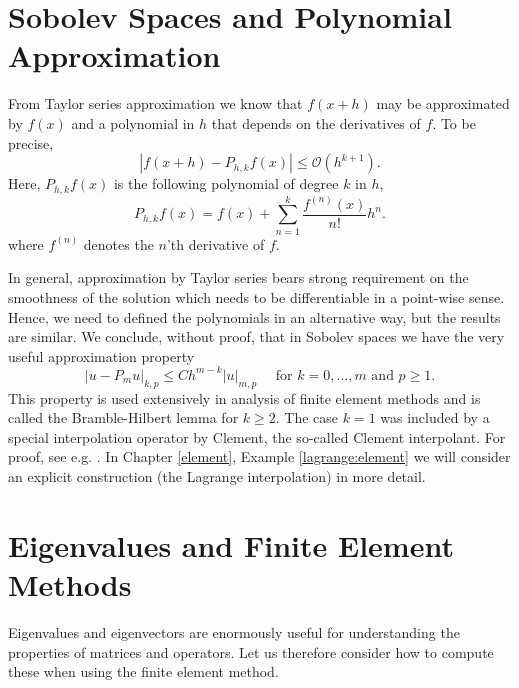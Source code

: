 \section{Sobolev Spaces and Polynomial Approximation}
From Taylor series approximation we know that  $f(x+h)$ may be approximated
by $f(x)$ and a polynomial in $h$ that depends on the derivatives of $f$. 
To be precise, 
\[
|f(x+h) - P_{h,k} f (x) |  \le  \mathcal{O}(h^{k+1}) .    
\]
Here, $P_{h,k} f(x)$ is the following polynomial of degree $k$ in $h$, 
\[
P_{h,k} f(x) = f(x) + \sum_{n=1}^k \frac{f^{(n)}(x)}{n!} h^n . 
\]
where $f^{(n)}$ denotes the $n$'th derivative of $f$. 

In general, approximation by Taylor series bears strong requirement on the smoothness 
of the solution which needs to be differentiable in a point-wise sense.   
Hence, we need to defined the polynomials in an alternative way, but the
results are similar.  We conclude, without proof, that  in Sobolev spaces we have the very useful approximation property  
\begin{equation}
\label{bramblehilbert}
|u - P_m u|_{k,p} \le C h^{m-k} |u|_{m,p} \quad \mbox{ for } k=0,\ldots,m \mbox{ and }  p\ge 1. 
\end{equation}
This property is used extensively in analysis of finite element methods and
is called the Bramble-Hilbert lemma for $k\ge 2$. The case $k=1$ was included by a special interpolation operator by 
Clement, the so-called Clement interpolant. 
For proof, see e.g. \cite{braess2007finite, brenner2008mathematical}.  
In Chapter \ref{element}, Example \ref{lagrange:element} we will consider an explicit construction (the Lagrange interpolation) in more detail. 



\section{Eigenvalues and Finite Element Methods}
\label{sec:eig and fem}

Eigenvalues and eigenvectors are enormously useful for understanding the properties 
of matrices and operators. Let us therefore consider how to compute these when using the finite element method. 

